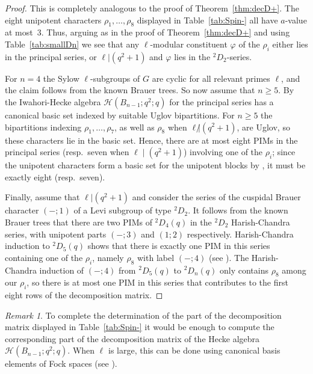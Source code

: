 \documentclass[12pt,leqno,a4paper]{amsart}
\newcommand{\cH}{{\mathcal{H}}}
\newcommand{\tw}[1]{{}^{#1}\!}
\let\vhi=\varphi
\theoremstyle{remark}
\newtheorem{rem}[thm]{Remark}
\begin{document}
\begin{proof}
This is completely analogous to the proof of Theorem~\ref{thm:decD+}.
The eight unipotent characters $\rho_1,\ldots,\rho_8$ displayed in
Table~\ref{tab:Spin-} all have $a$-value at most~3. Thus, arguing as in the
proof of Theorem~\ref{thm:decD+} and using Table~\ref{tab:smallDn} we see that
any $\ell$-modular constituent $\vhi$ of the $\rho_i$ either lies in the
principal series, or $\ell|(q^2+1)$ and $\vhi$ lies in the $\tw2D_2$-series.
\par
For $n=4$ the Sylow $\ell$-subgroups of $G$ are cyclic for all relevant primes
$\ell$, and the claim follows from the known Brauer trees. So now assume that
$n\ge5$.
By \cite[Thm.~5.8.13]{GJ11} the Iwahori-Hecke algebra $\cH(B_{n-1};q^2;q)$
for the principal series has a canonical basic set indexed by suitable Uglov
bipartitions. For $n\ge5$ the bipartitions indexing $\rho_1,\ldots,\rho_7$,
as well as $\rho_8$ when $\ell{\not|}(q^2+1)$, are Uglov, so these characters
lie in the basic set. Hence, there are at most eight PIMs in the principal
series (resp.~seven when $\ell\mid(q^2+1)$) involving one of the $\rho_i$;
since the unipotent characters form a basic set for the unipotent blocks by
\cite{GH91}, it must be exactly eight (resp.~seven).
\par
Finally, assume that $\ell|(q^2+1)$ and consider the series of the cuspidal
Brauer character $(-;1)$ of a Levi subgroup of type $\tw2D_2$. It follows from
the known Brauer trees that there are two PIMs of $\tw2D_4(q)$ in the
$\tw2D_2$ Harish-Chandra series, with unipotent parts $(-;3)$ and $(1;2)$
respectively. Harish-Chandra induction to $\tw2D_5(q)$ shows that there is
exactly one PIM in this series containing one of the $\rho_i$, namely
$\rho_8$ with label $(-;4)$ (see \cite[Thm.~7.1]{DM16}). The Harish-Chandra
induction of $(-;4)$ from $\tw2D_5(q)$ to $\tw2D_n(q)$ only contains $\rho_8$
among our $\rho_i$, so there is at most one PIM in this series that contributes
to the first eight rows of the decomposition matrix.
\end{proof}

\begin{rem}
To complete the determination of the part of the decomposition matrix displayed
in Table~\ref{tab:Spin-} it would be enough to compute the corresponding part
of the decomposition matrix of the Hecke algebra $\cH(B_{n-1};q^2;q)$. When
$\ell$ is large, this can be done using canonical basis elements of Fock
spaces (see \cite[\S 6.4]{GJ11}).
\end{rem}
\end{document}
